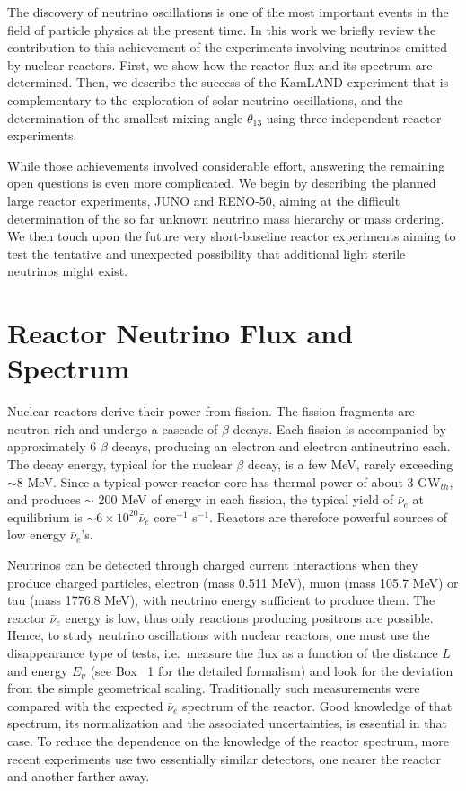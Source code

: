 \documentclass[aps,twocolumn,preprintnumbers,amsmath,superscriptaddress,amssymb,floats,nofootinbib]{revtex4-1}
\begin{document}
The discovery of neutrino oscillations is one of the most important events in the
field of particle physics at the present time. In this work we briefly review the
contribution to this achievement of the experiments involving neutrinos emitted 
by nuclear reactors. First, we show how the reactor flux and its 
spectrum are determined. Then, we describe the success of the 
KamLAND experiment that is complementary to the exploration of solar neutrino 
oscillations, and the determination of the smallest mixing angle 
$\theta_{13}$ using three independent reactor experiments.

While those achievements involved considerable effort, answering the remaining 
open questions is even more complicated. We begin by describing the planned large reactor experiments, JUNO and RENO-50, aiming at the difficult determination 
of the so far unknown neutrino mass hierarchy or mass ordering.  We then touch upon the future very short-baseline reactor experiments aiming to test the tentative and unexpected 
possibility that additional light sterile neutrinos might exist.

\section{Reactor Neutrino Flux and Spectrum} 
\label{sec:flux}

Nuclear reactors derive their power from fission. The fission fragments are neutron rich and undergo a cascade of $\beta$ decays. 
Each fission is accompanied by approximately 6 $\beta$ decays, producing an electron and electron antineutrino each. 
The decay energy, typical for the nuclear $\beta$ decay, is a few MeV, rarely exceeding $\sim$8 MeV. 
Since a typical power reactor core has thermal power of about 3 GW$_{th}$, and produces
$\sim$ 200 MeV of energy in each fission, the typical yield of $\bar{\nu}_e$ at equilibrium is $\sim 6 \times 10^{20} \bar{\nu}_e$ core$^{-1}$ s$^{-1}$.   
Reactors are therefore powerful sources of low energy $\bar{\nu}_e$'s.

Neutrinos can be detected through charged current interactions when they produce charged particles, electron (mass 0.511 MeV),
muon (mass 105.7 MeV) or tau (mass 1776.8 MeV), with neutrino energy sufficient to
produce them. The reactor $\bar{\nu}_e$ energy is low, thus only reactions producing positrons are possible. Hence, to study neutrino oscillations with nuclear reactors, one must use the disappearance type of tests, i.e.~measure the flux as a function of the distance $L$ and energy $E_{\nu}$ (see Box ~1 for the detailed formalism) and
look for the deviation from the simple geometrical scaling. Traditionally such measurements were compared with the expected  $\bar{\nu}_e$ spectrum
of the reactor. Good knowledge of that spectrum, its normalization and the associated uncertainties, is essential in that case.  
To reduce the dependence on the knowledge of the reactor spectrum, more recent experiments
\cite{Dayabay,Reno} use two essentially similar detectors, one nearer the reactor and another farther away.
\end{document}
